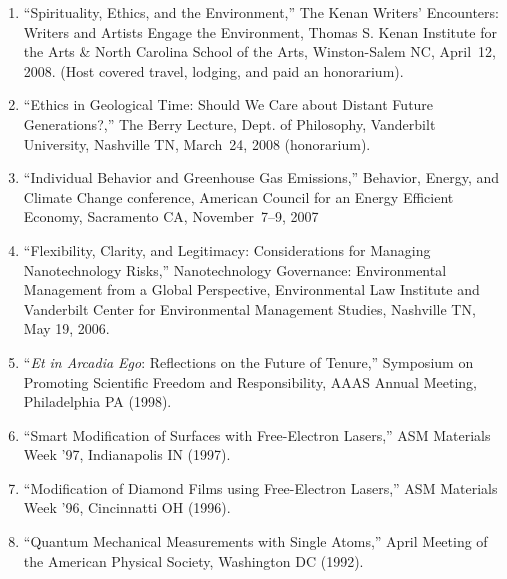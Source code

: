 \begin{enumerate}
\item ``Spirituality, Ethics, and the Environment,'' The Kenan Writers' Encounters: Writers and Artists Engage the Environment, Thomas S. Kenan Institute for the Arts \& North Carolina School of the Arts, Winston-Salem NC, April~12, 2008. (Host covered travel, lodging, and paid an honorarium).
\item ``Ethics in Geological Time: Should We Care about Distant Future Generations?,'' The Berry Lecture, Dept. of Philosophy, Vanderbilt University, Nashville TN, March~24, 2008 (honorarium).
\item ``Individual Behavior and Greenhouse Gas Emissions,'' Behavior, Energy, and Climate Change conference, American Council for an Energy Efficient Economy, Sacramento CA, November~7--9, 2007
\item ``Flexibility, Clarity, and Legitimacy: Considerations for Managing Nanotechnology Risks,'' Nanotechnology Governance: Environmental Management from a Global Perspective, Environmental Law Institute and Vanderbilt Center for Environmental Management Studies, Nashville TN, May 19, 2006.
\item ``\emph{Et in Arcadia Ego}: Reflections on the Future of Tenure,'' Symposium on Promoting Scientific Freedom and Responsibility, AAAS Annual Meeting, Philadelphia PA (1998).
\item ``Smart Modification of Surfaces with Free-Electron Lasers,'' ASM Materials Week '97, Indianapolis IN (1997).
\item ``Modification of Diamond Films using Free-Electron Lasers,'' ASM Materials Week '96, Cincinnatti OH (1996).
\item ``Quantum Mechanical Measurements with Single Atoms,'' April Meeting of the American Physical Society, Washington DC (1992).
\end{enumerate}
